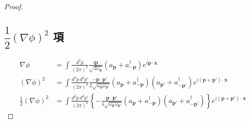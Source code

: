 \documentclass[a4paper,12pt]{article}
\begin{document}
\begin{proof}
\subsection*{$\dfrac{1}{2} (\nabla \phi)^2$ 項}
\begin{align*}
    \nabla \phi &= \int \frac{d^3 p}{(2\pi)^3} \frac{i\mathbf{p}}{\sqrt{2\omega_{\mathbf{p}}}} \left( a_{\mathbf{p}}  + a^\dagger_{-\mathbf{p}} \right) e^{i\mathbf{p}\cdot\mathbf{x}} \tag{2-3.j7}\\
    (\nabla \phi)^2 &= \int \frac{d^3 p \, d^3 p'}{(2\pi)^6} \frac{-\mathbf{p}\cdot\mathbf{p}'}{2\sqrt{\omega_{\mathbf{p}}\omega_{\mathbf{p}'}}} \left( a_{\mathbf{p}}  + a^\dagger_{-\mathbf{p}} \right) \left( a_{\mathbf{p}'}  + a^\dagger_{-\mathbf{p}'} \right) e^{i(\mathbf{p}+\mathbf{p}')\cdot\mathbf{x}} \tag{2-3.j8}\\
    \frac{1}{2} (\nabla \phi)^2 &= \int \frac{d^3 p \, d^3 p'}{(2\pi)^6} \left\{-\frac{\mathbf{p}\cdot\mathbf{p}'}{4\sqrt{\omega_{\mathbf{p}}\omega_{\mathbf{p}'}}} \left( a_{\mathbf{p}}  + a^\dagger_{-\mathbf{p}} \right) \left( a_{\mathbf{p}'}  + a^\dagger_{-\mathbf{p}'} \right)\right\} e^{i(\mathbf{p}+\mathbf{p}')\cdot\mathbf{x}} \tag{2-3.j9}
\end{align*}

\end{proof}
\end{document}
